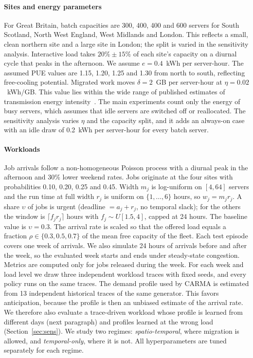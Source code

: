 \paragraph{Sites and energy parameters} For Great Britain, batch capacities are 300, 400, 400 and 600 servers for South Scotland, North West England, West Midlands and London. This reflects a small, clean northern site and a large site in London; the split is varied in the sensitivity analysis. Interactive load takes $20\%\pm15\%$ of each site's capacity on a diurnal cycle that peaks in the afternoon. We assume $e=0.4$~kWh per server-hour. The assumed PUE values are 1.15, 1.20, 1.25 and 1.30 from north to south, reflecting free-cooling potential. Migrated work moves $\delta=2$~GB per server-hour at $\eta=0.02$~kWh/GB. This value lies within the wide range of published estimates of transmission energy intensity~\cite{aslan2018electricity}. The main experiments count only the energy of busy servers, which assumes that idle servers are switched off or reallocated. The sensitivity analysis varies $\eta$ and the capacity split, and it adds an always-on case with an idle draw of 0.2~kWh per server-hour for every batch server.

\paragraph{Workloads} Job arrivals follow a non-homogeneous Poisson process with a diurnal peak in the afternoon and 30\% lower weekend rates. Jobs originate at the four sites with probabilities 0.10, 0.20, 0.25 and 0.45. Width $m_j$ is log-uniform on $[4,64]$ servers and the run time at full width $r_j$ is uniform on $\{1,\dots,6\}$ hours, so $w_j=m_jr_j$. A share $\upsilon$ of jobs is urgent (deadline $=a_j+r_j$, no temporal slack); for the others the window is $\lceil f_j r_j\rceil$ hours with $f_j\sim U[1.5,4]$, capped at 24 hours. The baseline value is $\upsilon=0.3$. The arrival rate is scaled so that the offered load equals a fraction $\rho\in\{0.3,0.5,0.7\}$ of the mean free capacity of the fleet. Each test episode covers one week of arrivals. We also simulate 24 hours of arrivals before and after the week, so the evaluated week starts and ends under steady-state congestion. Metrics are computed only for jobs released during the week. For each week and load level we draw three independent workload traces with fixed seeds, and every policy runs on the same traces. The demand profile used by CARMA is estimated from 13 independent historical traces of the same generator. This favors anticipation, because the profile is then an unbiased estimate of the arrival rate. We therefore also evaluate a trace-driven workload whose profile is learned from different days (next paragraph) and profiles learned at the wrong load (Section~\ref{sec:sens}). We study two regimes: \emph{spatio-temporal}, where migration is allowed, and \emph{temporal-only}, where it is not. All hyperparameters are tuned separately for each regime.

